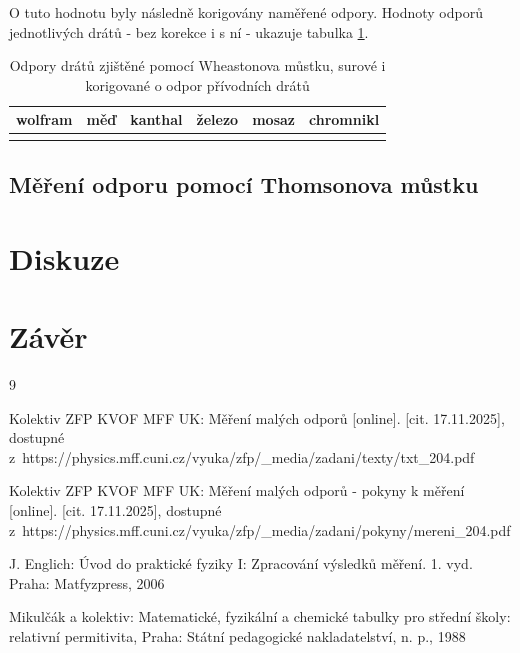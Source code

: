 \documentclass{../concepts/prepareprotokol} %
\begin{document}
O tuto hodnotu byly následně korigovány naměřené odpory. Hodnoty odporů jednotlivých drátů - bez korekce i s ní -
ukazuje tabulka \ref{tab:wheaston}.

\begin{table}[!hbtp]
\centering
\caption{Odpory drátů zjištěné pomocí Wheastonova můstku, surové i korigované o odpor přívodních drátů}
\begin{tabular}{cccccc}
 \toprule
 wolfram & měď & kanthal & železo & mosaz & chromnikl \\
 \midrule
   &  &  &  &  &  \\
 \bottomrule
\end{tabular}
\label{tab:wheaston}
\end{table}




\subsection{Měření odporu pomocí Thomsonova můstku}




\section{Diskuze}


\section{Závěr}


\begin{thebibliography}{9}

 Kolektiv ZFP KVOF MFF UK: Měření malých odporů [online]. [cit. 17.11.2025], dostupné z~https://physics.mff.cuni.cz/vyuka/zfp/\_media/zadani/texty/txt\_204.pdf

 Kolektiv ZFP KVOF MFF UK: Měření malých odporů - pokyny k měření [online]. [cit. 17.11.2025], dostupné
z~https://physics.mff.cuni.cz/vyuka/zfp/\_media/zadani/pokyny/mereni\_204.pdf

 J. Englich: Úvod do praktické fyziky I: Zpracování výsledků měření. 1. vyd. Praha: Matfyzpress, 2006

 Mikulčák a kolektiv: Matematické, fyzikální a chemické tabulky pro střední školy: relativní permitivita, Praha: Státní pedagogické nakladatelství, n. p., 1988

\end{thebibliography}
\end{document}
